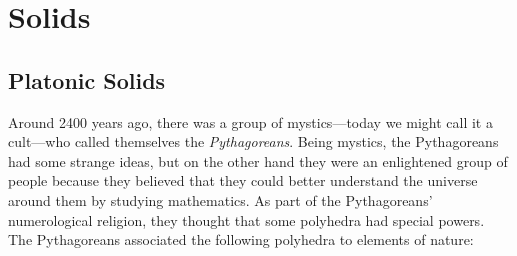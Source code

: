 \newpage



\section{Solids}

\subsection{Platonic Solids}

Around 2400 years ago, there was a group of mystics---today we might
call it a cult---who called themselves the
\textit{Pythagoreans}. Being
mystics, the Pythagoreans had some strange ideas, but on the other
hand they were an enlightened group of people because they believed
that they could better understand the universe around them by studying
mathematics. As part of the Pythagoreans' numerological religion, they
thought that some polyhedra had special powers. The Pythagoreans
associated the following polyhedra to elements of nature:

